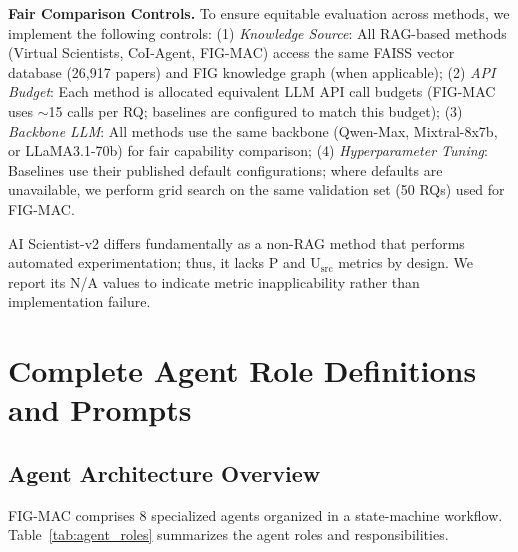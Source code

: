 \documentclass[runningheads]{llncs}
\begin{document}
\textbf{Fair Comparison Controls.} To ensure equitable evaluation across methods, we implement the following controls: (1) \textit{Knowledge Source}: All RAG-based methods (Virtual Scientists, CoI-Agent, FIG-MAC) access the same FAISS vector database (26,917 papers) and FIG knowledge graph (when applicable); (2) \textit{API Budget}: Each method is allocated equivalent LLM API call budgets (FIG-MAC uses $\sim$15 calls per RQ; baselines are configured to match this budget); (3) \textit{Backbone LLM}: All methods use the same backbone (Qwen-Max, Mixtral-8x7b, or LLaMA3.1-70b) for fair capability comparison; (4) \textit{Hyperparameter Tuning}: Baselines use their published default configurations; where defaults are unavailable, we perform grid search on the same validation set (50 RQs) used for FIG-MAC.

AI Scientist-v2 differs fundamentally as a non-RAG method that performs automated experimentation; thus, it lacks P and U$_{\text{src}}$ metrics by design. We report its N/A values to indicate metric inapplicability rather than implementation failure.


\section{Complete Agent Role Definitions and Prompts}
\label{app:agent_prompts}

\subsection{Agent Architecture Overview}

FIG-MAC comprises 8 specialized agents organized in a state-machine workflow. Table~\ref{tab:agent_roles} summarizes the agent roles and responsibilities.
\end{document}
